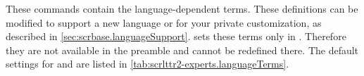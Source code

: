 \begin{Declaration}
\end{Declaration}
These commands contain the language-dependent terms. These definitions can be
modified to support a new language or for your private customization, as
described in
\autoref{sec:scrbase.languageSupport}. \KOMAScript{} sets these terms only in
. Therefore they are not available in the
preamble and cannot be redefined there. The default settings for
 and  are listed in
\autoref{tab:scrlttr2-experts.languageTerms}.%
\EndIndexGroup

